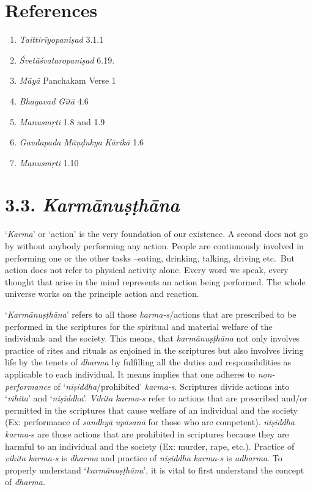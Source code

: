 \section*{References}

\begin{enumerate}
\itemsep=0pt
\item
  \emph{Taittirīyopaniṣad} 3.1.1
\item
  \emph{Śvetāśvataropaniṣad} 6.19.
\item
  \emph{Māyā} Panchakam Verse 1
\item
  \emph{Bhagavad Gītā} 4.6
\item
  \emph{Manusmṛti} 1.8 and 1.9
\item
  \emph{Gaudapada} \emph{Māṇḍukya} \emph{Kārikā} 1.6
\item
  \emph{Manusmṛti} 1.10
\end{enumerate}
\newpage

\section*{3.3. \emph{Karmānuṣṭhāna}}

`\emph{Karma}' or `action' is the very foundation of our existence. A second does not go by without anybody performing any action. People are continuously involved in performing one or the other tasks --eating, drinking, talking, driving etc.\ But action does not refer to physical activity alone. Every word we speak, every thought that arise in the mind represents an action being performed. The whole universe works on the principle action and reaction.

`\emph{Karmānuṣṭhāna}' refers to all those \emph{karma-s}/actions that are prescribed to be performed in the scriptures for the spiritual and material welfare of the individuals and the society. This means, that \emph{karmānuṣṭhāna} not only involves practice of rites and rituals as enjoined in the scriptures but also involves living life by the tenets of \emph{dharma} by fulfilling all the duties and responsibilities as applicable to each individual. It means implies that one adheres to \emph{non-performance} of `\emph{niṣiddha}/prohibited' \emph{karma-s}. Scriptures divide actions into `\emph{vihita}' and `\emph{niṣiddha}'. \emph{Vihita} \emph{karma-s} refer to actions that are prescribed and/or permitted in the scriptures that cause welfare of an individual and the society (Ex: performance of \emph{sandhyā} \emph{upāsanā} for those who are competent). \emph{niṣiddha} \emph{karma-}s are those actions that are prohibited in scriptures because they are harmful to an individual and the society (Ex: murder, rape, etc.). Practice of \emph{vihita} \emph{karma-s} is \emph{dharma} and practice of \emph{niṣiddha} \emph{karma-s} is \emph{adharma}. To properly understand `\emph{karmānuṣṭhāna}', it is vital to first understand the concept of \emph{dharma}.

